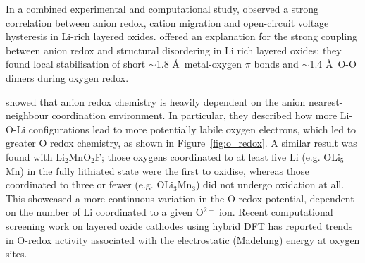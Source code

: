 \documentclass[../main.tex]{subfiles}
\begin{document}
In a combined experimental and computational study, \citeauthor{Gent2017} observed a strong correlation between anion redox, cation migration and open-circuit voltage hysteresis in Li-rich layered oxides.\cite{Gent2017} \citeauthor{Hong2019} offered an explanation for the strong coupling between anion redox and structural disordering in Li rich layered oxides; they found local stabilisation of short $\sim$1.8 \AA \ metal-oxygen $\pi$ bonds and $\sim$1.4 \AA \ O-O dimers during oxygen redox.\cite{Hong2019}

\citeauthor{Seo2016} showed that anion redox chemistry is heavily dependent on the anion nearest-neighbour coordination environment.\cite{Seo2016} In particular, they described how more Li-O-Li configurations lead to more potentially labile oxygen electrons, which led to greater O redox chemistry, as shown in Figure~\ref{fig:o_redox}. A similar result was found with Li$_2$MnO$_2$F; those oxygens coordinated to at least five Li (e.g. OLi$_5$Mn) in the fully lithiated state were the first to oxidise, whereas those coordinated to three or fewer (e.g. OLi$_3$Mn$_3$) did not undergo oxidation at all. This showcased a more continuous variation in the O-redox potential, dependent on the number of Li coordinated to a given O$^{2-}$ ion.\cite{Sharpe2020} Recent computational screening work on layered oxide cathodes using hybrid DFT has reported trends in O-redox activity associated with the electrostatic (Madelung) energy at oxygen sites.\cite{Davies2020}
\end{document}
